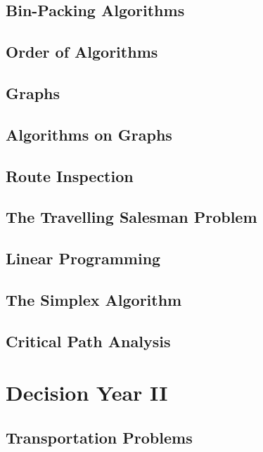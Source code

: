 \documentclass{book}
\begin{document}
        \newpage

        \section{Bin-Packing Algorithms}

        \newpage
        
        \section{Order of Algorithms}

        \newpage

    \newpage
    \section{Graphs} \label{graphs}
    \newpage
    \section{Algorithms on Graphs} \label{algorithms_on_graphs}
    \newpage
    \section{Route Inspection} \label{route_inspection}
    \newpage
    \section{The Travelling Salesman Problem} \label{the_travelling_salesman_problem}
    \newpage
    \section{Linear Programming} \label{linea_programming}
    \newpage
    \section{The Simplex Algorithm} \label{the_simplex_algorithm}
    \newpage
    \section{Critical Path Analysis} \label{critical_path_analysis}
    \newpage

\chapter{Decision Year II} \label{ch:decision_ii}
    \section{Transportation Problems} \label{transportation_problems}
    \newpage
\end{document}
